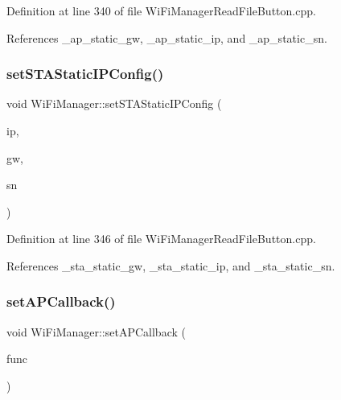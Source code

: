 Definition at line 340 of file Wi\+Fi\+Manager\+Read\+File\+Button.\+cpp.



References \+\_\+ap\+\_\+static\+\_\+gw, \+\_\+ap\+\_\+static\+\_\+ip, and \+\_\+ap\+\_\+static\+\_\+sn.

\mbox{\label{class_wi_fi_manager_a124d89536d0ba5b5bd117e6c44a53e8d}} 
\subsubsection{\texorpdfstring{set\+S\+T\+A\+Static\+I\+P\+Config()}{setSTAStaticIPConfig()}}
{\footnotesize\ttfamily void Wi\+Fi\+Manager\+::set\+S\+T\+A\+Static\+I\+P\+Config (\begin{DoxyParamCaption}\item[{I\+P\+Address}]{ip,  }\item[{I\+P\+Address}]{gw,  }\item[{I\+P\+Address}]{sn }\end{DoxyParamCaption})}



Definition at line 346 of file Wi\+Fi\+Manager\+Read\+File\+Button.\+cpp.



References \+\_\+sta\+\_\+static\+\_\+gw, \+\_\+sta\+\_\+static\+\_\+ip, and \+\_\+sta\+\_\+static\+\_\+sn.

\mbox{\label{class_wi_fi_manager_a353ab556f96020ad7a08e9a91cea8bea}} 
\subsubsection{\texorpdfstring{set\+A\+P\+Callback()}{setAPCallback()}}
{\footnotesize\ttfamily void Wi\+Fi\+Manager\+::set\+A\+P\+Callback (\begin{DoxyParamCaption}\item[{void($\ast$)(\hyperlink{class_wi_fi_manager}{Wi\+Fi\+Manager} $\ast$)}]{func }\end{DoxyParamCaption})}



